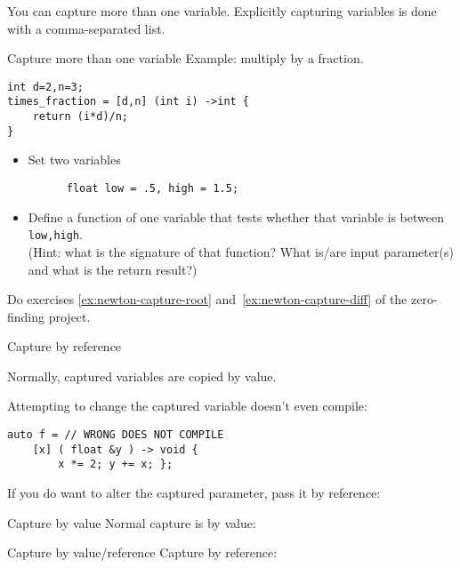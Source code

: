 You can capture more than one variable.
Explicitly capturing variables is done with a comma-separated list.

\begin{block}{Capture more than one variable}
  \label{sl:capture-fraction}
  Example: multiply by a fraction.
\begin{lstlisting}
int d=2,n=3;
times_fraction = [d,n] (int i) ->int {
    return (i*d)/n;
}
\end{lstlisting}
\end{block}

\begin{exercise}
  \label{ex:capture-between}
  \begin{itemize}
  \item Set two variables 
    \begin{lstlisting}
      float low = .5, high = 1.5;
    \end{lstlisting}
  \item Define a function of one variable that tests
    whether that variable is between \lstinline{low,high}.\\
    (Hint: what is the signature of that function?
    What is/are input parameter(s) and what is the return result?)
  \end{itemize}
\end{exercise}

\begin{exercise}
  Do exercises \ref{ex:newton-capture-root} and~\ref{ex:newton-capture-diff}
  of the zero-finding project.
\end{exercise}

 {Capture by reference}

Normally, captured variables are copied by value.

Attempting to change the captured variable doesn't even compile:
\begin{lstlisting}
auto f = // WRONG DOES NOT COMPILE
    [x] ( float &y ) -> void {
        x *= 2; y += x; };
\end{lstlisting}

If you do want to alter the captured parameter,
pass it by reference:

\begin{slide}{Capture by value}
  \label{sl:lambda-val-val}
Normal capture is by value:
\end{slide}

\begin{slide}{Capture by value/reference}
  \label{sl:lambda-ref-ref}
  Capture by reference:
\end{slide}

